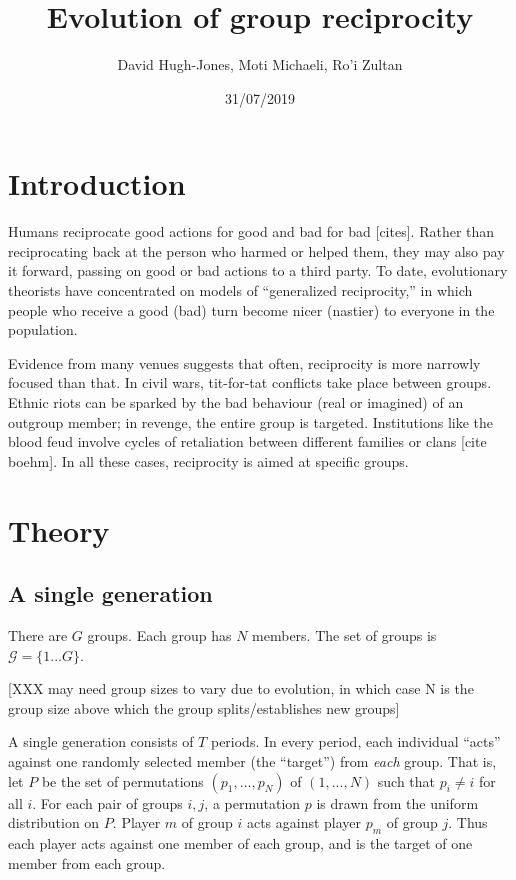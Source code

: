 \documentclass[
]{article}
\title{Evolution of group reciprocity}
\author{David Hugh-Jones, Moti Michaeli, Ro'i Zultan}
\date{31/07/2019}
\begin{document}
\maketitle

\hypertarget{introduction}{%
\section{Introduction}\label{introduction}}

Humans reciprocate good actions for good and bad for bad {[}cites{]}.
Rather than reciprocating back at the person who harmed or helped them,
they may also pay it forward, passing on good or bad actions to a third
party. To date, evolutionary theorists have concentrated on models of
``generalized reciprocity,'' in which people who receive a good (bad)
turn become nicer (nastier) to everyone in the population.

Evidence from many venues suggests that often, reciprocity is more
narrowly focused than that. In civil wars, tit-for-tat conflicts take
place between groups. Ethnic riots can be sparked by the bad behaviour
(real or imagined) of an outgroup member; in revenge, the entire group
is targeted. Institutions like the blood feud involve cycles of
retaliation between different families or clans {[}cite boehm{]}. In all
these cases, reciprocity is aimed at specific groups.

\hypertarget{theory}{%
\section{Theory}\label{theory}}

\hypertarget{a-single-generation}{%
\subsection{A single generation}\label{a-single-generation}}

There are \(G\) groups. Each group has \(N\) members. The set of groups
is \(\mathcal{G} = \{1 ... G\}\).

{[}XXX may need group sizes to vary due to evolution, in which case N is
the group size above which the group splits/establishes new groups{]}

A single generation consists of \(T\) periods. In every period, each
individual ``acts'' against one randomly selected member (the
``target'') from \emph{each} group. That is, let \(P\) be the set of
permutations \((p_1, ..., p_N)\) of \((1, ..., N)\) such that
\(p_i \ne i\) for all \(i\). For each pair of groups \(i, j\), a
permutation \(p\) is drawn from the uniform distribution on \(P\).
Player \(m\) of group \(i\) acts against player \(p_m\) of group \(j\).
Thus each player acts against one member of each group, and is the
target of one member from each group.
\end{document}
